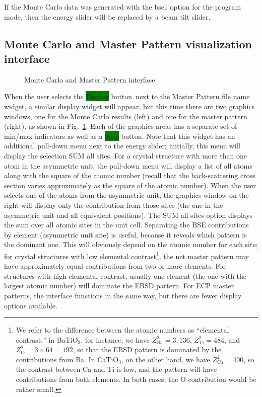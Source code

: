 \documentclass[DIV=calc, paper=letter, fontsize=11pt]{scrartcl}	 %
\newcommand{\button}[1]{\colorbox{green}{\textsf{#1}} button}
\begin{document}
If the Monte Carlo data was generated with the \textsf{bse1} option for the program mode, then the energy slider will be replaced by a beam tilt slider.


\subsection{Monte Carlo and Master Pattern visualization interface\label{sec:idlMCMP}}

\begin{figure}[t]
\leavevmode\centering
\epsfxsize=6in
\caption{\label{fig:MCMPdisplay}Monte Carlo and Master Pattern interface.}
\end{figure}

When the user selects the \button{Display}\ next to the Master Pattern file name widget, a similar display widget will appear, but this time there 
are two graphics windows, one for the Monte Carlo results (left) and one for the master pattern (right), as shown in 
Fig.~\ref{fig:MCMPdisplay}.  Each of the graphics areas has a separate set of min/max indicators as well as a \button{Save}.
Note that this widget has an additional pull-down menu next to the energy slider; initially, this menu will display the selection
\textsf{SUM all sites}.  For a crystal structure with more than one atom in the asymmetric unit, the pull-down menu will
display a list of all atoms along with the square of the atomic number (recall that the back-scattering cross section varies
approximately as the square of the atomic number).  When the user selects one of the atoms from the asymmetric unit, 
the graphics window on the right will display only the contribution from those sites (the one in the asymmetric unit
and all equivalent positions).  The \textsf{SUM all sites} option displays the sum over all atomic sites in the unit cell.
Separating the BSE contributions by element (asymmetric unit site) is useful, because it reveals which pattern is the dominant one.  
This will obviously depend on the atomic number for each site; for crystal structures with low elemental contrast\footnote{We refer
to the difference between the atomic numbers as ``elemental contrast;''  in BaTiO$_3$, for instance, we have $Z^2_{\text{Ba}}=3,136$,
$Z^2_{\text{Ti}}=484$, and $Z^2_{\text{O}}=3\times 64=192$, so that the EBSD pattern is dominated by the contributions from Ba.  In CaTiO$_3$, on the
other hand, we have $Z^2_{\text{Ca}}=400$, so the contrast between Ca and Ti is low, and the pattern will have contributions from
both elements.  In both cases, the O contribution would be rather small.}, the net master pattern may have approximately equal contributions 
from two or more elements.  For structures with high elemental contrast, usually one element (the one with the largest atomic number) will
dominate the EBSD pattern.  For ECP master patterns, the interface functions in the same way, but there are fewer display options available.
\end{document}
